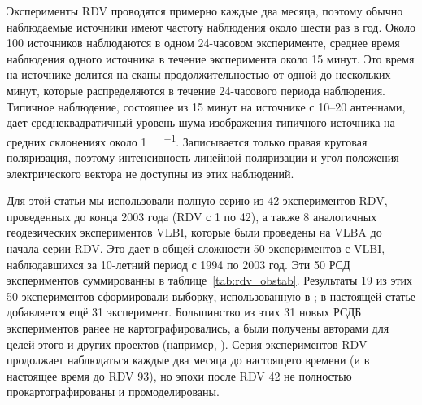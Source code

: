 Эксперименты RDV проводятся примерно каждые два месяца, поэтому обычно наблюдаемые источники
имеют частоту наблюдения около шести раз в год. Около 100 источников наблюдаются в одном 24-часовом
эксперименте, среднее время наблюдения одного источника в течение эксперимента около 15 минут. Это
время на источнике делится на сканы продолжительностью от одной до нескольких минут, которые
распределяются в течение 24-часового периода наблюдения. Типичное наблюдение, состоящее из 15 минут
на источнике с 10--20 антеннами, дает среднеквадратичный уровень шума изображения типичного
источника на средних склонениях около \SI{1}{\milli\jansky\per\beam}. Записывается только правая
круговая поляризация, поэтому интенсивность линейной поляризации и угол положения электрического
вектора не доступны из этих наблюдений.

Для этой статьи мы использовали полную серию из 42 экспериментов RDV, проведенных до конца 2003 года
(RDV с 1 по 42), а также 8 аналогичных геодезических экспериментов VLBI, которые были проведены на
VLBA до начала серии RDV. Это дает в общей сложности 50 экспериментов с VLBI, наблюдавшихся за
10-летний период с 1994 по 2003 год. Эти 50 РСД экспериментов суммированны в
таблице~\ref{tab:rdv_obstab}. Результаты 19 из этих 50 экспериментов сформировали выборку,
использованную в \cite{Piner_2007}; в настоящей статье добавляется ещё 31 эксперимент. Большинство
из этих 31 новых РСДБ экспериментов ранее не картографировались, а были получены авторами для целей
этого и других проектов (например, \cite{Pushkarev_2012b}). Серия экспериментов RDV продолжает
наблюдаться каждые два месяца до настоящего времени (и в настоящее время до RDV 93), но эпохи после
RDV 42 не полностью прокартографированы и промоделированы.

